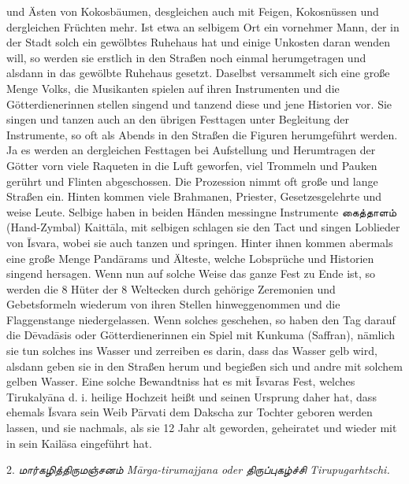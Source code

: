 \documentclass{article}
\newcommand{\TamilText}[1]{\texttamil{#1}}
\newcommand{\tam}[1]{\TamilText{#1}}
\begin{document}
und Ästen von Kokosbäumen, desgleichen auch mit Feigen, Kokosnüssen und dergleichen Früchten mehr. Ist etwa an selbigem Ort ein vornehmer Mann, der in der Stadt solch ein gewölbtes Ruhehaus hat und einige Unkosten daran wenden will, so werden sie erstlich in den Straßen noch einmal herumgetragen und alsdann in das gewölbte Ruhehaus gesetzt. Daselbst versammelt sich eine große Menge Volks, die Musikanten spielen auf ihren Instrumenten und die Götterdienerinnen stellen singend und tanzend diese und jene Historien vor. Sie singen und tanzen auch an den übrigen Festtagen unter Begleitung der Instrumente, so oft als Abends in den Straßen die Figuren herumgeführt werden. Ja es werden an dergleichen Festtagen bei Aufstellung und Herumtragen der Götter vorn viele Raqueten in die Luft geworfen, viel Trommeln und Pauken gerührt und Flinten abgeschossen. Die Prozession nimmt oft große und lange Straßen ein. Hinten kommen viele Brahmanen, Priester, Gesetzesgelehrte und weise Leute. Selbige haben in beiden Händen messingne Instrumente \tam{கைத்தாளம்} (Hand-Zymbal) Kaitt\={a}la, mit selbigen schlagen sie den Tact und singen Loblieder von \={I}svara, wobei sie auch tanzen und springen. Hinter ihnen kommen abermals eine große Menge Pand\={a}rams und Älteste, welche Lobsprüche und Historien singend hersagen. Wenn nun auf solche Weise das ganze Fest zu Ende ist, so werden die 8 Hüter der 8 Weltecken durch gehörige Zeremonien und Gebetsformeln wiederum von ihren Stellen hinweggenommen und die Flaggenstange niedergelassen. Wenn solches geschehen, so haben den Tag darauf die D\={e}vad\={a}sis oder Götterdienerinnen ein Spiel mit Kunkuma (Saffran), nämlich sie tun solches ins Wasser und zerreiben es darin, dass das Wasser gelb wird, alsdann geben sie in den Straßen herum und begießen sich und andre mit solchem gelben Wasser. Eine solche Bewandtniss hat es mit \={I}svaras Fest, welches Tirukaly\={a}na d. i. heilige Hochzeit heißt und seinen Ursprung daher hat, dass ehemals \={I}svara sein Weib P\={a}rvati dem Dakscha zur Tochter geboren werden lassen, und sie nachmals, als sie 12 Jahr alt geworden, geheiratet und wieder mit in sein Kail\={a}sa eingeführt hat.

\begin{center}
2. \emph{\tam{மார்கழித்திருமஞ்சனம்} M\={a}rga-tirumajjana oder \tam{திருப்புகழ்ச்சி} Tirupugarhtschi.}
\end{center}
\end{document}
